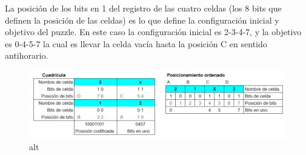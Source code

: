 \documentclass[11pt]{article}
\begin{document}
La posición de los bits en 1 del registro de las cuatro celdas (los 8
bits que definen la posición de las celdas) es lo que define la
configuración inicial y objetivo del puzzle. En este caso la
configuración inicial es 2-3-4-7, y la objetivo es 0-4-5-7 la cual es
llevar la celda vacía hasta la posición C en sentido antihorario.

\begin{figure}
\centering
\includegraphics{Posicion-final1.png}
\caption{alt}
\end{figure}
\end{document}

